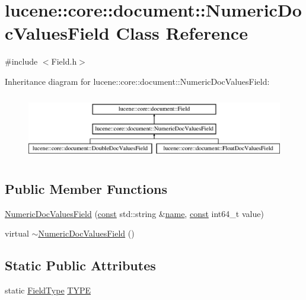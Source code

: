 \hypertarget{classlucene_1_1core_1_1document_1_1NumericDocValuesField}{}\section{lucene\+:\+:core\+:\+:document\+:\+:Numeric\+Doc\+Values\+Field Class Reference}
\label{classlucene_1_1core_1_1document_1_1NumericDocValuesField}


{\ttfamily \#include $<$Field.\+h$>$}

Inheritance diagram for lucene\+:\+:core\+:\+:document\+:\+:Numeric\+Doc\+Values\+Field\+:\begin{figure}[H]
\begin{center}
\leavevmode
\includegraphics[height=2.866894cm]{classlucene_1_1core_1_1document_1_1NumericDocValuesField}
\end{center}
\end{figure}
\subsection*{Public Member Functions}
\begin{DoxyCompactItemize}
\item 
\mbox{\hyperlink{classlucene_1_1core_1_1document_1_1NumericDocValuesField_a5eab1eee3fb4a8410e4f2914cc70a3d5}{Numeric\+Doc\+Values\+Field}} (\mbox{\hyperlink{ZlibCrc32_8h_a2c212835823e3c54a8ab6d95c652660e}{const}} std\+::string \&\mbox{\hyperlink{classlucene_1_1core_1_1document_1_1Field_a52f673f3b3abb14b180f5159f4726537}{name}}, \mbox{\hyperlink{ZlibCrc32_8h_a2c212835823e3c54a8ab6d95c652660e}{const}} int64\+\_\+t value)
\item 
virtual \mbox{\hyperlink{classlucene_1_1core_1_1document_1_1NumericDocValuesField_a210b7cc10e0d4bc6326783150e44bd1e}{$\sim$\+Numeric\+Doc\+Values\+Field}} ()
\end{DoxyCompactItemize}
\subsection*{Static Public Attributes}
\begin{DoxyCompactItemize}
\item 
static \mbox{\hyperlink{classlucene_1_1core_1_1document_1_1FieldType}{Field\+Type}} \mbox{\hyperlink{classlucene_1_1core_1_1document_1_1NumericDocValuesField_a3d911f68265bf4abfe3ce797650bb239}{T\+Y\+PE}}
\end{DoxyCompactItemize}
